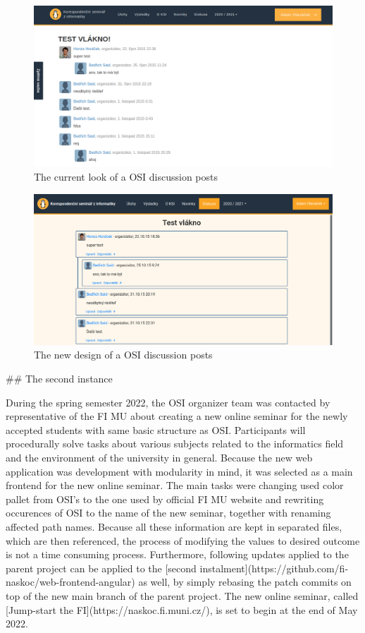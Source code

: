 \documentclass[
  digital, %
  oneside, %
  lof,     %
  lot,     %
]{fithesis4}
\begin{document}
{\begin{figure}
\includegraphics[width=\textwidth]{assets/img/discussion-curr}
\caption{The current look of a OSI discussion posts}
\label{fig:discuss-curr}
\end{figure}

\begin{figure}
\includegraphics[width=\textwidth]{assets/img/discussion-new}
\caption{The new design of a OSI discussion posts}
\label{fig:discuss-new}
\end{figure}

## The second instance

During the spring semester 2022, the OSI organizer team was contacted by representative of the FI MU about creating a new online seminar for the newly accepted students with same basic structure as OSI. Participants will procedurally solve tasks about various subjects related to the informatics field and the environment of the university in general. Because the new web application was development with modularity in mind, it was selected as a main frontend for the new online seminar. The main tasks were changing used color pallet from OSI's to the one used by official FI MU website and rewriting occurences of OSI to the name of the new seminar, together with renaming affected path names. Because all these information are kept in separated files, which are then referenced, the process of modifying the values to desired outcome is not a time consuming process. Furthermore, following updates applied to the parent project can be applied to the [second instalment](https://github.com/fi-naskoc/web-frontend-angular) as well, by simply rebasing the patch commits on top of the new main branch of the parent project. The new online seminar, called [Jump-start the FI](https://naskoc.fi.muni.cz/), is set to begin at the end of May 2022.

}
\end{document}
